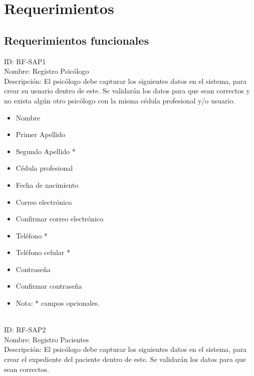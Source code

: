 \section{Requerimientos}

\subsection{Requerimientos funcionales}

\noindent
ID: RF-SAP1\\
Nombre: Registro Psicólogo\\
Descripción: El psicólogo debe capturar los siguientes datos en el sistema, para crear su usuario
dentro de este. Se validarán los datos para que sean correctos y no exista algún otro psicólogo con la misma cédula profesional y/o usuario.

\begin{itemize}
    \item Nombre
    \item Primer Apellido
    \item Segundo Apellido *
    \item Cédula profesional
    \item Fecha de nacimiento
    \item Correo electrónico
    \item Confirmar correo electrónico
    \item Teléfono *
    \item Teléfono celular *
    \item Contraseña
    \item Confirmar contraseña
    \item Nota: * campos opcionales.
\end{itemize}
\vspace{4cm}
\\

\noindent
ID: RF-SAP2\\
Nombre: Registro Pacientes\\
Descripción: El psicólogo debe capturar los siguientes datos en el sistema, para crear el expediente del paciente dentro de este. Se validarán los datos para que sean correctos.

